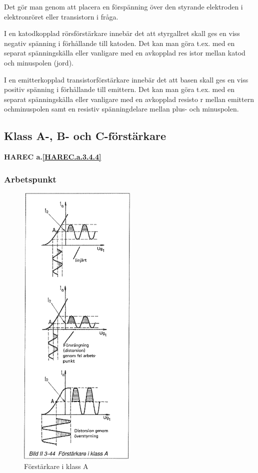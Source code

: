 Det gör man genom att placera en förspänning över den styrande
elektroden i elektronröret eller transistorn i fråga.

I en katodkopplad rörsförstärkare innebär det att styrgallret skall
ges en viss negativ spänning i förhållande till katoden. Det kan man
göra t.ex. med en separat spänningskälla eller vanligare med en
avkopplad res istor mellan katod och minuspolen (jord).

I en emitterkopplad transistorförstärkare innebär det att basen skall
ges en viss positiv spänning i förhållande till emittern. Det kan man
göra t.ex. med en separat spänningskälla eller vanligare med en
avkopplad resisto r mellan emittern ochminuspolen samt en resistiv
spänningdelare mellan plus- och minuspolen.

\subsection{Klass A-, B- och C-förstärkare}
\textbf{HAREC a.\ref{HAREC.a.3.4.4}\label{myHAREC.a.3.4.4}}

\subsubsection{Arbetspunkt}

\begin{figure}
\includegraphics[width=0.5\textwidth]{images/bild_2_3-44}
\caption{Förstärkare i klass A}
\label{fig:BildII3-44}
\end{figure}


